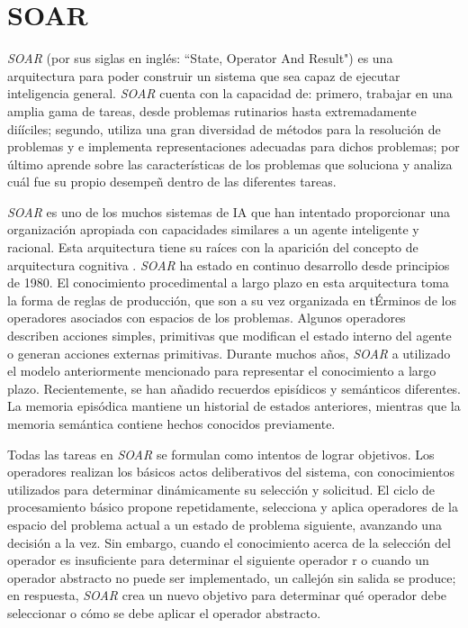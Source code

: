 \section{SOAR}

\emph{SOAR} (por sus siglas en ingl\'{e}s: “State, Operator And Result") es una arquitectura para poder construir un sistema que sea capaz de ejecutar inteligencia general. \emph{SOAR} cuenta con la capacidad de: primero, trabajar en una amplia gama de tareas, desde problemas rutinarios hasta extremadamente di\'{i}íciles; segundo, utiliza una gran diversidad de m\'{e}todos para la resoluci\'{o}n de problemas y e implementa representaciones adecuadas para dichos problemas; por \'{u}ltimo aprende sobre las caracter\'{i}sticas de los problemas que soluciona y analiza cu\'{a}l fue su propio desempe\~n dentro de las diferentes tareas.

 \emph{SOAR} es uno de los muchos sistemas de IA que han intentado proporcionar una organizaci\'{o}n apropiada con capacidades similares a un agente inteligente y racional. Esta arquitectura tiene su raíces con la aparición del concepto de arquitectura cognitiva \cite{newell1973production}.
 \emph{SOAR} ha estado en continuo desarrollo desde principios de 1980. El conocimiento procedimental a largo plazo en esta arquitectura toma la forma de reglas de producción, que son a su vez organizada en t\'{E}rminos de los operadores asociados con espacios de los problemas. Algunos operadores describen acciones simples, primitivas que modifican el estado interno del agente o generan acciones externas primitivas. Durante muchos años, \emph{SOAR} a utilizado el modelo anteriormente mencionado para representar el conocimiento a largo plazo. Recientemente, se han añadido recuerdos epis\'{i}dicos y sem\'{a}nticos diferentes. La memoria epis\'{o}dica  mantiene un historial de estados anteriores, mientras que la memoria sem\'{a}ntica contiene hechos conocidos previamente\cite{laird1987soar}.
 
Todas las tareas en \emph{SOAR} se formulan como intentos de lograr objetivos. Los operadores realizan los b\'{a}sicos actos deliberativos del sistema, con conocimientos utilizados para determinar din\'{a}micamente su selección y solicitud. El ciclo de procesamiento b\'{a}sico propone repetidamente, selecciona y aplica operadores de la
espacio del problema actual a un estado de problema siguiente, avanzando una decisi\'{o}n a la vez. Sin embargo, cuando el conocimiento acerca de la selección del operador es insuficiente para determinar el siguiente operador r o cuando un operador abstracto no puede ser implementado, un callejón sin salida se produce; en respuesta, \emph{SOAR} crea un nuevo objetivo para determinar qué operador debe seleccionar o c\'{o}mo se debe aplicar el operador abstracto\cite{langley2009cognitive}.

